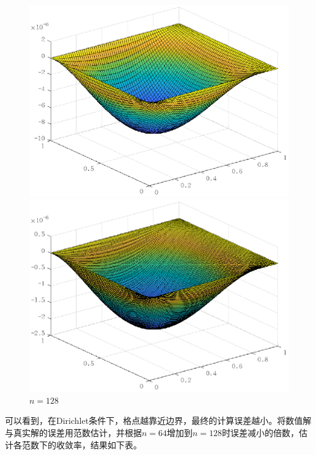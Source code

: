 \documentclass[lang=cn,11pt,a4paper]{elegantpaper}
\begin{document}
\begin{figure}[htbp]
\begin{minipage}[t]{0.24\linewidth}
    \includegraphics[width=0.95\linewidth]{figure/error_problem1_D_r_n=64.eps}
    \caption*{$n=64$}
  \end{minipage}
  \begin{minipage}[t]{0.24\linewidth}
    \centering
    \includegraphics[width=0.95\linewidth]{figure/error_problem1_D_r_n=128.eps}
    \caption*{$n=128$}
  \end{minipage}
\end{figure}

可以看到，在Dirichlet条件下，格点越靠近边界，最终的计算误差越小。将数值解与真实解的误差用范数估计，并根据$n=64$增加到$n=128$时误差减小的倍数，估计各范数下的收敛率，结果如下表。
\end{document}
